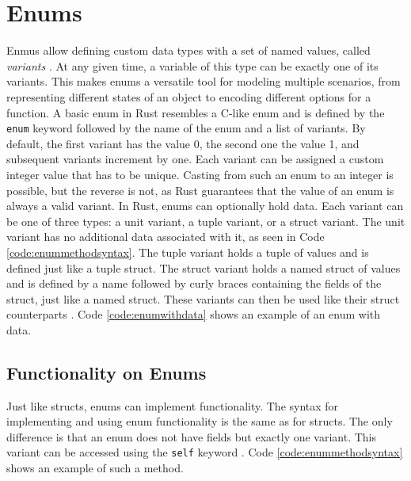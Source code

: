 \section{Enums}
Enmus allow defining custom data types with a set of named values, called \textit{variants} \cite[230]{Blandy_Jim2021-07-20}.
At any given time, a variable of this type can be exactly one of its variants.
\noindent This makes enums a versatile tool for modeling multiple scenarios, from representing different states of an object to encoding different options for a function.
A basic enum in Rust resembles a C-like enum and is defined by the \texttt{enum} keyword followed by the name of the enum and a list of variants.
By default, the first variant has the value 0, the second one the value 1, and subsequent variants increment by one.
\noindent Each variant can be assigned a custom integer value that has to be unique.
Casting from such an enum to an integer is possible, but the reverse is not, as Rust guarantees that the value of an enum is always a valid variant.
\noindent In Rust, enums can optionally hold data.
Each variant can be one of three types: a unit variant, a tuple variant, or a struct variant.
The unit variant has no additional data associated with it, as seen in Code \ref{code:enummethodsyntax}.
The tuple variant holds a tuple of values and is defined just like a tuple struct.
The struct variant holds a named struct of values and is defined by a name followed by curly braces containing the fields of the struct, just like a named struct.
These variants can then be used like their struct counterparts \cite[Chapter~6.7]{rustref} \cite[230-234]{Blandy_Jim2021-07-20}.
Code \ref{code:enumwithdata} shows an example of an enum with data.


\subsection{Functionality on Enums}
Just like structs, enums can implement functionality. The syntax for implementing and using enum functionality is the same as for structs.
The only difference is that an enum does not have fields but exactly one variant.
This variant can be accessed using the \texttt{self} keyword \cite[Chapter~6.1]{rustbook}.
Code \ref{code:enummethodsyntax} shows an example of such a method.


